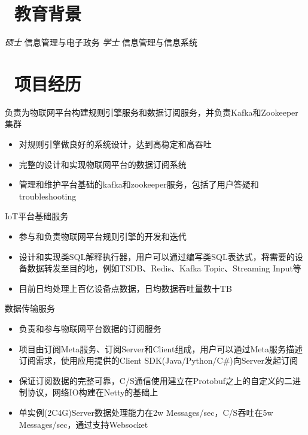 \documentclass{resume}
\begin{document}


 
\section{\faGraduationCap\  教育背景}
\textit{硕士} 信息管理与电子政务
\textit{学士} 信息管理与信息系统

\section{\faUsers\ 项目经历}
负责为物联网平台构建规则引擎服务和数据订阅服务，并负责Kafka和Zookeeper集群
\begin{itemize}
  \item 对规则引擎做良好的系统设计，达到高稳定和高吞吐
  \item 完整的设计和实现物联网平台的数据订阅系统
  \item 管理和维护平台基础的kafka和zookeeper服务，包括了用户答疑和troubleshooting
\end{itemize}

IoT平台基础服务
\begin{itemize}
  \item 参与和负责物联网平台规则引擎的开发和迭代
  \item 设计和实现类SQL解释执行器，用户可以通过编写类SQL表达式，将需要的设备数据转发至目的地，例如TSDB、Redis、Kafka Topic、Streaming Input等
  \item 目前日均处理上百亿设备点数据，日均数据吞吐量数十TB
\end{itemize}

数据传输服务
\begin{itemize}
  \item 负责和参与物联网平台数据的订阅服务
  \item 项目由订阅Meta服务、订阅Server和Client组成，用户可以通过Meta服务描述订阅需求，使用应用提供的Client SDK(Java/Python/C#)向Server发起订阅
  \item 保证订阅数据的完整可靠，C/S通信使用建立在Protobuf之上的自定义的二进制协议，网络IO构建在Netty的基础上
  \item 单实例(2C4G)Server数据处理能力在2w Messages/sec，C/S吞吐在5w Messages/sec，通过支持Websocket
\end{itemize}
\end{document}
